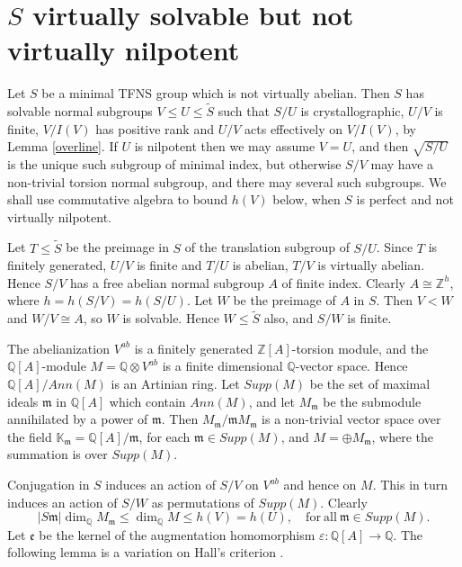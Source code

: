 \documentclass[12pt]{amsart}
\renewcommand{\leq}{\leqslant}
\begin{document}
\section{ $S$ virtually solvable but not virtually nilpotent}

Let $S$ be a minimal TFNS group which is not virtually abelian.
Then $S$ has solvable normal subgroups $V\leq{U}\leq\widetilde{S}$ such that
$S/U$ is crystallographic,  $U/V$ is finite, $V/I(V)$ has positive rank
and $U/V$ acts effectively on $V/I(V)$,
by Lemma \ref{overline}.
If $U$ is nilpotent then we may assume $V=U$, and then
$\sqrt{S/U}$ is the unique such subgroup of minimal index,
but otherwise $S/V$ may have a non-trivial torsion normal subgroup,
and there may several such subgroups.
We shall use commutative algebra to bound $h(V)$ below,
when $S$ is perfect and not virtually nilpotent.

Let $T\leq\widetilde{S}$ be the preimage in $S$ of the translation
subgroup of $S/U$. 
Since $T$ is finitely generated, $U/V$ is finite and $T/U$ is abelian,
$T/V$ is virtually abelian.
Hence $S/V$ has a free abelian normal subgroup $A$ of finite index.
Clearly $A\cong\mathbb{Z}^h$, where $h=h(S/V)=h(S/U)$.
Let $W$ be the preimage of $A$ in $S$.
Then $V<W$ and $W/V\cong{A}$, so $W$ is solvable.
Hence $W\leq\widetilde{S}$ also, and $S/W$ is finite.

The abelianization $V^{ab}$ is a finitely generated $\mathbb{Z}[A]$-torsion module,
and the $\mathbb{Q}[A]$-module $M=\mathbb{Q}\otimes{V}^{ab}$ is 
a finite dimensional $\mathbb{Q}$-vector space.
Hence $\mathbb{Q}[A]/Ann(M)$ is an Artinian ring.
Let $Supp(M)$ be the set of maximal ideals $\mathfrak{m}$ in  $\mathbb{Q}[A]$
which contain $Ann(M)$, and let $M_\mathfrak{m}$ be the
submodule annihilated by a power of $\mathfrak{m}$.
Then $M_\mathfrak{m}/\mathfrak{m}M_\mathfrak{m}$
is a non-trivial vector space over the field 
$\mathbb{K}_\mathfrak{m}=\mathbb{Q}[A]/{\mathfrak{m}}$,
for each $\mathfrak{m}\in{Supp(M)}$,
and  $M=\oplus{M_\mathfrak{m}}$, 
where the summation is over $Supp(M)$.

Conjugation in $S$ induces an action of $S/V$ on $V^{ab}$ and hence on $M$.
This in turn induces an action of $S/W$ as permutations of $Supp(M)$.
Clearly 
\[
|S\mathfrak{m}|\dim_\mathbb{Q}M_\mathfrak{m}\leq\dim_\mathbb{Q}M\leq{h(V)}=h(U),
\quad\mathrm{for~all}~\mathfrak{m}\in{Supp(M)}.
\]
Let $\mathfrak{e}$ be the kernel of the augmentation homomorphism 
$\varepsilon:\mathbb{Q}[A]\to\mathbb{Q}$.
The following lemma is a variation on Hall's criterion \cite[5.2.10]{Ro}.
\end{document}
